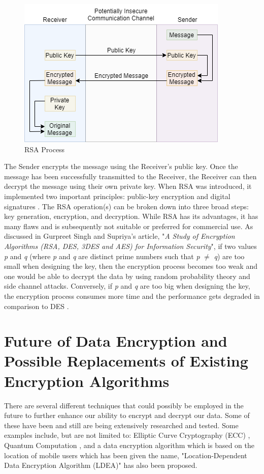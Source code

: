 \documentclass[journal]{IEEEtran}
\begin{document}
\newline
\begin{figure}[!h]
    \centering
    \includegraphics[scale=.4]{rsa}
    \caption{RSA Process}
    \label{fig:rsa}
\end{figure}

The Sender encrypts the message using the Receiver's public key. Once the message has been successfully transmitted to the Receiver, the Receiver can then decrypt the message using their own private key. When RSA was introduced, it implemented two important principles: public-key encryption and digital signatures \cite{rsa}. The RSA operation(s) can be broken down into three broad steps: key generation, encryption, and decryption. While RSA has its advantages, it has many flaws and is subsequently not suitable or preferred for commercial use. As discussed in Gurpreet Singh and Supriya's article, "\textit{A Study of Encryption Algorithms (RSA, DES, 3DES and AES) for Information Security}", if two values \textit{p} and \textit{q} (where \textit{p} and \textit{q} are distinct prime numbers such that \textit{p} $\neq$ \textit{q}) are too small when designing the key, then the encryption process becomes too weak and one would be able to decrypt the data by using random probability theory and side channel attacks. Conversely, if \textit{p} and \textit{q} are too big when designing the key, the encryption process consumes more time and the performance gets degraded in comparison to DES \cite{encryption_study}. 

\section{\textbf{Future of Data Encryption and Possible Replacements of Existing Encryption Algorithms}}
There are several different techniques that could possibly be employed in the future to further enhance our ability to encrypt and decrypt our data. Some of these have been and still are being extensively researched and tested. Some examples include, but are not limited to: Elliptic Curve Cryptography (ECC) \cite{ecc}, Quantum Computation \cite{quantum_computing_encryption}, and a data encryption algorithm which is based on the location of mobile users which has been given the name, "Location-Dependent Data Encryption Algorithm (LDEA)" \cite{new_encryption_mobile} has also been proposed.
\end{document}
